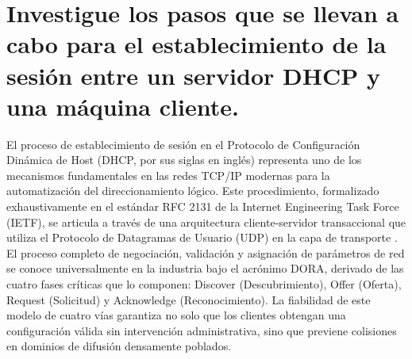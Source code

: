 \documentclass[a4paper,12pt]{article}
\begin{document}
\renewcommand{\footrulewidth}{0.4pt}  %

\setcounter{page}{1}

\tableofcontents


\newpage

\section{Investigue los pasos que se llevan a cabo para el establecimiento de la sesión entre un servidor DHCP y una máquina cliente.}

El proceso de establecimiento de sesión en el Protocolo de Configuración Dinámica de Host (DHCP, por sus siglas en inglés) representa uno de los mecanismos fundamentales en las redes TCP/IP modernas para la automatización del direccionamiento lógico. Este procedimiento, formalizado exhaustivamente en el estándar RFC 2131 de la Internet Engineering Task Force (IETF), se articula a través de una arquitectura cliente-servidor transaccional que utiliza el Protocolo de Datagramas de Usuario (UDP) en la capa de transporte \cite{rfc2131, microsoft_dhcp}. El proceso completo de negociación, validación y asignación de parámetros de red se conoce universalmente en la industria bajo el acrónimo DORA, derivado de las cuatro fases críticas que lo componen: Discover (Descubrimiento), Offer (Oferta), Request (Solicitud) y Acknowledge (Reconocimiento). La fiabilidad de este modelo de cuatro vías garantiza no solo que los clientes obtengan una configuración válida sin intervención administrativa, sino que previene colisiones en dominios de difusión densamente poblados.
\end{document}
